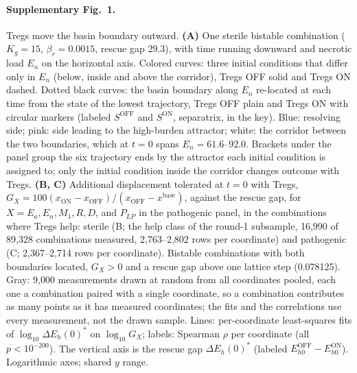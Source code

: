 \documentclass[11pt]{article}
\newcommand{\gap}{\Delta E_h(0)^{*}}
\begin{document}
\paragraph{Supplementary Fig.~1.}
Tregs move the basin boundary outward. \textbf{(A)} One sterile bistable combination
($K_g = 15$, $\beta_r = 0.0015$, rescue gap 29.3), with time running downward and
necrotic load $E_n$ on the horizontal axis. Colored curves: three initial conditions that differ
only in $E_n$ (below, inside and above the corridor), Tregs OFF solid and Tregs ON dashed. Dotted
black curves: the basin boundary along $E_n$ re-located at each time from the state of the
lowest trajectory, Tregs OFF plain and Tregs ON with circular markers (labeled
$S^{\mathrm{OFF}}$ and $S^{\mathrm{ON}}$, separatrix, in the key). Blue: resolving side; pink:
side leading to the high-burden attractor; white: the corridor between the two boundaries,
which at $t = 0$ spans $E_n = 61.6$--$92.0$. Brackets under the panel group the six trajectory
ends by the attractor each initial condition is assigned to; only the initial condition inside
the corridor changes outcome with Tregs. \textbf{(B, C)} Additional displacement tolerated
at $t = 0$ with Tregs, $G_X = 100(x_{\mathrm{ON}}-x_{\mathrm{OFF}})/(x_{\mathrm{OFF}}-x^{\mathrm{base}})$, against the
rescue gap, for $X = E_a, E_n, M_1, R, D$, and $P_{LP}$ in the pathogenic panel, in the combinations
where Tregs help: sterile (B; the
help class of the round-1 subsample, 16{,}990 of 89{,}328 combinations measured,
2{,}763--2{,}802 rows per coordinate) and pathogenic (C; 2{,}367--2{,}714 rows per coordinate). Bistable combinations with both boundaries located,
$G_X > 0$ and a rescue gap above one lattice step (0.078125). Gray: 9{,}000 measurements drawn at random from all
coordinates pooled, each one a combination paired with a single coordinate, so a combination
contributes as many points as it has measured coordinates; the fits and the correlations use
every measurement, not the drawn sample. Lines: per-coordinate least-squares fits of $\log_{10}\gap$ on $\log_{10}G_X$; labels:
Spearman $\rho$ per coordinate (all $p < 10^{-200}$). The vertical axis is the rescue gap $\gap$
(labeled $E_{h0}^{\mathrm{OFF}} - E_{h0}^{\mathrm{ON}}$). Logarithmic axes; shared $y$ range.

\end{document}
